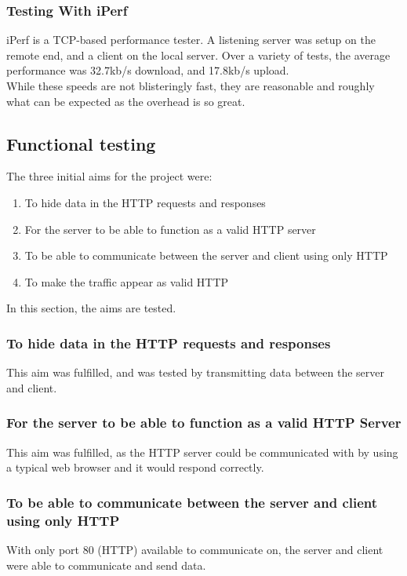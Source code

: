 \subsubsection*{Testing With iPerf}
iPerf is a TCP-based performance tester.
A listening server was setup on the remote end, and a client on the local server.
Over a variety of tests, the average performance was 32.7kb/s download, and 17.8kb/s upload.\\
While these speeds are not blisteringly fast, they are reasonable and roughly what can be expected as the overhead is so great.

\subsection{Functional testing}
The three initial aims for the project were:
\begin{enumerate}
    \item To hide data in the HTTP requests and responses
    \item For the server to be able to function as a valid HTTP server
    \item To be able to communicate between the server and client using only HTTP
    \item To make the traffic appear as valid HTTP
\end{enumerate}
In this section, the aims are tested.
\subsubsection*{To hide data in the HTTP requests and responses}
This aim was fulfilled, and was tested by transmitting data between the server and client.

\subsubsection*{For the server to be able to function as a valid HTTP Server}
This aim was fulfilled, as the HTTP server could be communicated with by using a typical web browser and it would respond correctly.

\subsubsection*{To be able to communicate between the server and client using only HTTP}
With only port 80 (HTTP) available to communicate on, the server and client were able to communicate and send data.

